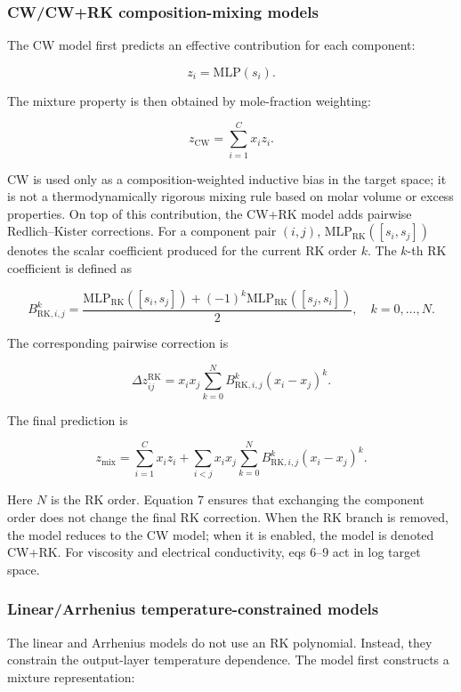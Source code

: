 \documentclass[journal=jctcce,manuscript=article,doi=true]{achemso}
\providecommand{\texorpdfstring}[2]{#1}
\begin{document}
\subsubsection{CW/CW+RK composition-mixing models}\label{sec:cwrk}

The CW model first predicts an effective contribution for each component:

\[
z_i=\mathrm{MLP}(s_i).
\tag{5}
\]

The mixture property is then obtained by mole-fraction weighting:

\[
z_{\mathrm{CW}}=\sum_{i=1}^{C}x_i z_i.
\tag{6}
\]

CW is used only as a composition-weighted inductive bias in the target space; it is not a thermodynamically rigorous mixing rule based on molar volume or excess properties. On top of this contribution, the CW+RK model adds pairwise Redlich--Kister corrections. For a component pair \((i,j)\), \(\mathrm{MLP}_{\mathrm{RK}}([s_i,s_j])\) denotes the scalar coefficient produced for the current RK order \(k\). The \(k\)-th RK coefficient is defined as

\[
B^k_{\mathrm{RK},i,j}
=
\frac{
\mathrm{MLP}_{\mathrm{RK}}([s_i,s_j])
+(-1)^k\mathrm{MLP}_{\mathrm{RK}}([s_j,s_i])
}{2},
\quad k=0,\ldots,N.
\tag{7}
\]

The corresponding pairwise correction is

\[
\Delta z_{ij}^{\mathrm{RK}}
=
x_i x_j
\sum_{k=0}^{N}B^k_{\mathrm{RK},i,j}(x_i-x_j)^k.
\tag{8}
\]

The final prediction is

\[
z_{\mathrm{mix}}
=
\sum_{i=1}^{C}x_i z_i
+
\sum_{i< j}x_i x_j
\sum_{k=0}^{N}B^k_{\mathrm{RK},i,j}(x_i-x_j)^k.
\tag{9}
\]

\noindent Here \(N\) is the RK order. Equation 7 ensures that exchanging the component order does not change the final RK correction. When the RK branch is removed, the model reduces to the CW model; when it is enabled, the model is denoted CW+RK. For viscosity and electrical conductivity, eqs 6--9 act in log target space.

\subsubsection{\texorpdfstring{Linear/Arrhenius temperature-constrained models}{Linear/Arrhenius temperature-constrained models}}\label{sec:temperature-models}

The linear and Arrhenius models do not use an RK polynomial. Instead, they constrain the output-layer temperature dependence. The model first constructs a mixture representation:
\end{document}
